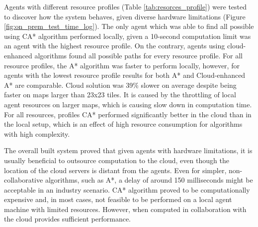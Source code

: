 Agents with different resource profiles (Table \ref{tab:resorces_profile}) were tested to discover how the system behaves, given diverse hardware limitations (Figure \ref{fig:on_prem_test_time_log}). The only agent which was able to find all possible using CA* algorithm performed locally, given a 10-second computation limit was an agent with the highest resource profile. On the contrary, agents using cloud-enhanced algorithms found all possible paths for every resource profile. For all resource profiles, the A* algorithm was faster to perform locally, however, for agents with the lowest resource profile results for both A* and Cloud-enhanced A* are comparable. Cloud  solution was 39\% slower on average despite being faster on maps larger than 23x23 tiles. It is caused by the throttling of local agent resources on larger maps, which is causing slow down in computation time. For all resources, profiles CA* performed significantly better in the cloud than in the local setup, which is an effect of high resource consumption for algorithms with high complexity.

The overall built system proved that given agents with hardware limitations, it is usually beneficial to outsource computation to the cloud, even though the location of the cloud servers is distant from the agents. Even for simpler, non-collaborative algorithms, such as A*, a delay of around 150 milliseconds might be acceptable in an industry scenario. CA* algorithm proved to be computationally expensive and, in most cases, not feasible to be performed on a local agent machine with limited resources. However, when computed in collaboration with the cloud provides sufficient performance.
